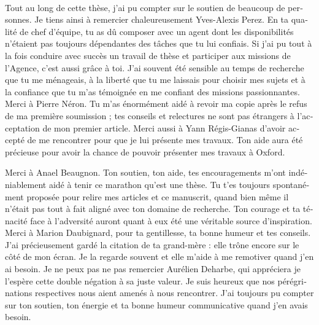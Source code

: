 \begin{otherlanguage}{french}
  \paragraph{}
  Tout au long de cette thèse, j’ai pu compter sur le soutien de beaucoup de
  personnes. Je tiens ainsi à remercier chaleureusement Yves-Alexis Perez. En
  ta qualité de chef d’équipe, tu as dû composer avec un agent dont les
  disponibilités n’étaient pas toujours dépendantes des tâches que tu lui
  confiais. Si j’ai pu tout à la fois conduire avec succès un travail de thèse
  et participer aux missions de l’Agence, c’est aussi grâce à toi. J’ai souvent
  été sensible au temps de recherche que tu me ménageais, à la liberté que tu me
  laissais pour choisir mes sujets et à la confiance que tu m’as témoignée en me
  confiant des missions passionnantes.
  Merci à Pierre Néron. Tu m’as énormément aidé à revoir ma copie après le refus
  de ma première soumission ; tes conseils et relectures ne sont pas étrangers à
  l’acceptation de mon premier article.
  Merci aussi à Yann Régis-Gianas d’avoir accepté de me rencontrer pour que je
  lui présente mes travaux. Ton aide aura été précieuse pour avoir la chance de
  pouvoir présenter mes travaux à Oxford.

  Merci à Anael Beaugnon. Ton soutien, ton aide, tes encouragements m’ont
  indéniablement aidé à tenir ce marathon qu'est une thèse. Tu t’es toujours
  spontanément proposée pour relire mes articles et ce manuscrit, quand bien
  même il n’était pas tout à fait aligné avec ton domaine de recherche. Ton
  courage et ta ténacité face à l’adversité auront quant à eux été une véritable
  source d’inspiration.
  Merci à Marion Daubignard, pour ta gentillesse, ta bonne humeur et tes
  conseils. J’ai précieusement gardé la citation de ta grand-mère : elle trône
  encore sur le côté de mon écran. Je la regarde souvent et elle m’aide à me
  remotiver quand j’en ai besoin.
  Je ne peux pas ne pas remercier Aurélien Deharbe, qui appréciera je l’espère
  cette double négation à sa juste valeur. Je suis heureux que nos
  pérégrinations respectives nous aient amenés à nous rencontrer. J’ai toujours
  pu compter sur ton soutien, ton énergie et ta bonne humeur communicative quand
  j’en avais besoin.


\end{otherlanguage}
